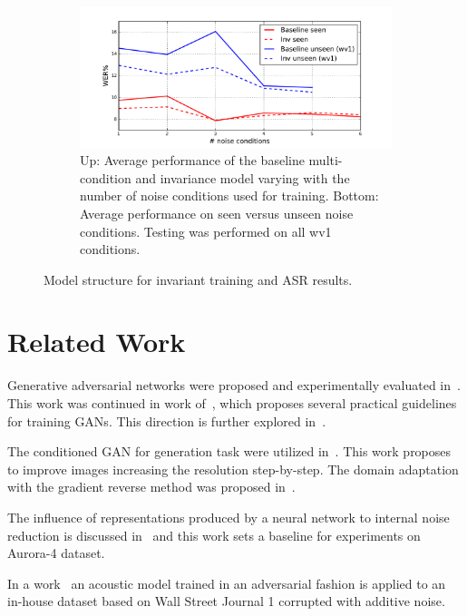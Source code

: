 \documentclass{article}
\begin{document}
\begin{figure}
\begin{subfigure}[b]{0.7\linewidth}
        \includegraphics[width=\linewidth]{wer_seen_unseen.pdf}
        \caption{Up: Average performance of the baseline multi-condition and invariance model varying with  the number of noise
            conditions used for training. Bottom: Average performance on seen versus unseen noise conditions.
            Testing was performed on all wv1 conditions.
            }
        \label{fig:results}
    \end{subfigure}
    \caption{Model structure for invariant training and ASR results.}
\end{figure}

\section{Related Work}
    Generative adversarial networks were proposed and experimentally evaluated 
    in~\cite{goodfellow2014generative}. This work was continued 
    in work of~\cite{radford2015unsupervised}, which proposes several practical guidelines
    for training GANs. This direction is further explored in~\cite{salimans2016improved}.

    The conditioned GAN for generation task were utilized in~\cite{denton2015deep}. This
    work proposes to improve images increasing the resolution step-by-step. 
    The domain adaptation with the gradient reverse method was proposed in~\cite{ganin2014unsupervised}.

    
    The influence of representations produced by a neural network to internal noise reduction 
    is discussed in~\cite{yu2013feature} and this work sets a baseline for experiments on
    Aurora-4 dataset.

    In a work~\cite{yusuke2016adversarial} an acoustic model trained in an adversarial fashion is
    applied to an in-house dataset based on Wall Street Journal 1 corrupted with additive noise.
    
\end{document}
